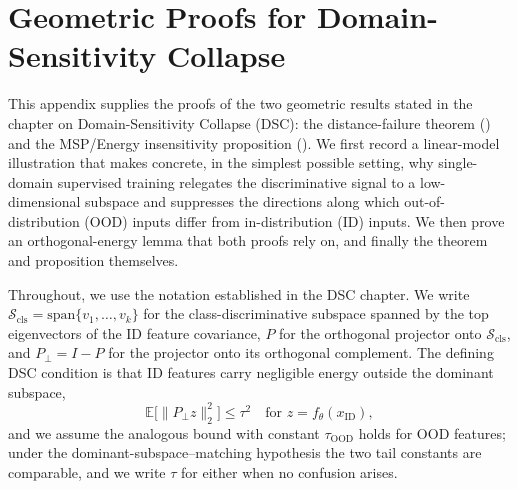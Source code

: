 %
\chapter{Geometric Proofs for Domain-Sensitivity Collapse}
\label{app:dsc-proofs}

This appendix supplies the proofs of the two geometric results stated in the
chapter on Domain-Sensitivity Collapse (DSC): the distance-failure theorem
() and the MSP/Energy insensitivity proposition
(). We first record a linear-model illustration that
makes concrete, in the simplest possible setting, why single-domain supervised
training relegates the discriminative signal to a low-dimensional subspace and
suppresses the directions along which out-of-distribution (OOD) inputs differ
from in-distribution (ID) inputs. We then prove an orthogonal-energy lemma that
both proofs rely on, and finally the theorem and proposition themselves.

Throughout, we use the notation established in the DSC chapter. We write
$\mathcal{S}_{\mathrm{cls}} = \mathrm{span}\{v_1,\ldots,v_k\}$ for the
class-discriminative subspace spanned by the top eigenvectors of the ID feature
covariance, $P$ for the orthogonal projector onto $\mathcal{S}_{\mathrm{cls}}$,
and $P_\perp = I - P$ for the projector onto its orthogonal complement. The
defining DSC condition is that ID features carry negligible energy outside the
dominant subspace,
\begin{equation} \mathbb{E}\bigl[\|P_\perp z\|_2^2\bigr] \le \tau^2 \quad \text{for } z = f_\theta(x_{\mathrm{ID}}), \label{eq:dsc:A1} \end{equation}
and we assume the analogous bound with constant $\tau_{\mathrm{OOD}}$ holds for
OOD features; under the dominant-subspace--matching hypothesis the two tail
constants are comparable, and we write $\tau$ for either when no confusion
arises.

